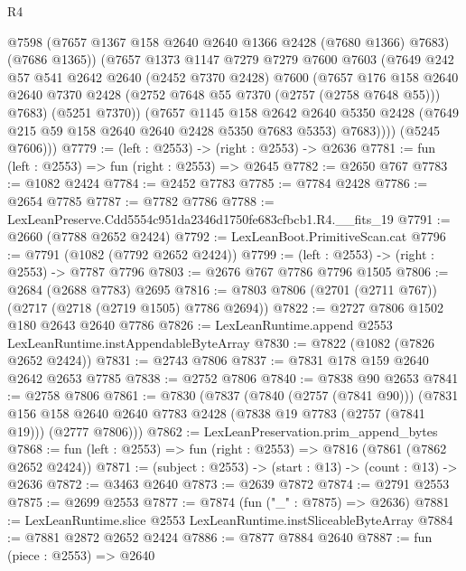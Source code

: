 \begin{lexlean}{R4}
\begin{coremodule}
              @7598
              (@7657 @1367 @158 @2640 @2640 @1366 @2428 (@7680 @1366) @7683)
              (@7686 @1365))
            (@7657
              @1373
              @1147
              @7279
              @7279
              @7600
              @7603
              (@7649
                @242
                @57
                @541
                @2642
                @2640
                (@2452 @7370 @2428)
                @7600
                (@7657
                  @176
                  @158
                  @2640
                  @2640
                  @7370
                  @2428
                  (@2752 @7648 @55 @7370 (@2757 (@2758 @7648 @55)))
                  @7683)
                (@5251 @7370))
              (@7657
                @1145
                @158
                @2642
                @2640
                @5350
                @2428
                (@7649 @215 @59 @158 @2640 @2640 @2428 @5350 @7683 @5353)
                @7683))))
        (@5245 @7606)))
@7779 := (left : @2553) -> (right : @2553) -> @2636
@7781 := fun (left : @2553) => fun (right : @2553) => @2645
@7782 := @2650 @767
@7783 := @1082 @2424
@7784 := @2452 @7783
@7785 := @7784 @2428
@7786 := @2654 @7785
@7787 := @7782 @7786
@7788 := LexLeanPreserve.Cdd5554c951da2346d1750fe683cfbcb1.R4.__fits_19
@7791 := @2660 (@7788 @2652 @2424)
@7792 := LexLeanBoot.PrimitiveScan.cat
@7796 := @7791 (@1082 (@7792 @2652 @2424))
@7799 := (left : @2553) -> (right : @2553) -> @7787 @7796
@7803 := @2676 @767 @7786 @7796 @1505
@7806 := @2684 (@2688 @7783) @2695
@7816 := @7803 @7806 (@2701 (@2711 @767)) (@2717 (@2718 (@2719 @1505) @7786 @2694))
@7822 := @2727 @7806 @1502 @180 @2643 @2640 @7786
@7826 := LexLeanRuntime.append @2553 LexLeanRuntime.instAppendableByteArray
@7830 := @7822 (@1082 (@7826 @2652 @2424))
@7831 := @2743 @7806
@7837 := @7831 @178 @159 @2640 @2642 @2653 @7785
@7838 := @2752 @7806
@7840 := @7838 @90 @2653
@7841 := @2758 @7806
@7861 := @7830
    (@7837
      (@7840 (@2757 (@7841 @90)))
      (@7831 @156 @158 @2640 @2640 @7783 @2428 (@7838 @19 @7783 (@2757 (@7841 @19))) (@2777 @7806)))
@7862 := LexLeanPreservation.prim_append_bytes
@7868 := fun (left : @2553) => fun (right : @2553) => @7816 (@7861 (@7862 @2652 @2424))
@7871 := (subject : @2553) -> (start : @13) -> (count : @13) -> @2636
@7872 := @3463 @2640
@7873 := @2639 @7872
@7874 := @2791 @2553
@7875 := @2699 @2553
@7877 := @7874 (fun ("_" : @7875) => @2636)
@7881 := LexLeanRuntime.slice @2553 LexLeanRuntime.instSliceableByteArray
@7884 := @7881 @2872 @2652 @2424
@7886 := @7877 @7884 @2640
@7887 := fun (piece : @2553) => @2640

\end{coremodule}
\end{lexlean}
